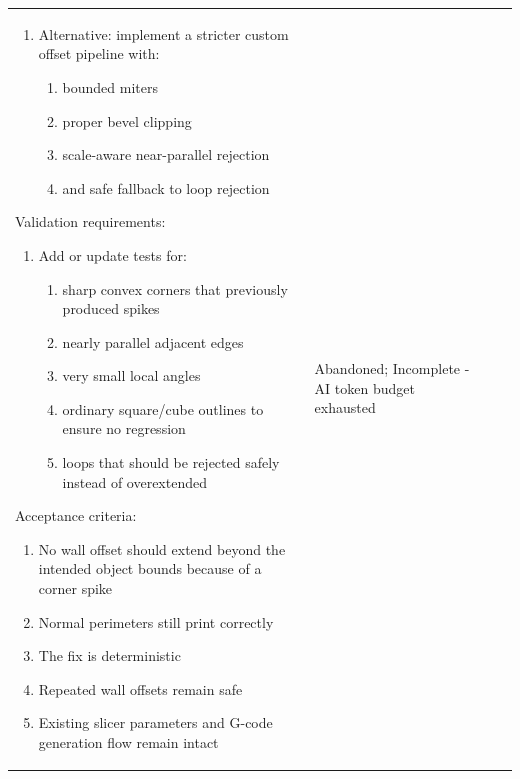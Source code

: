 \documentclass[10pt,twocolumn,a4paper]{article}
\begin{document}
\begin{longtable}{@{}p{0.6cm}p{1.5cm}p{11.0cm}p{2.7cm}@{}}
\begin{enumerate}
\begin{enumerate}
		\item{Alternative: implement a stricter custom offset pipeline with:}
		\begin{enumerate}
			\item{bounded miters}
			\item{proper bevel clipping}
			\item{scale-aware near-parallel rejection}
			\item{and safe fallback to loop rejection} 
		\end{enumerate}
	\end{enumerate}
\end{enumerate}
Validation requirements:
\begin{enumerate}
	\item{Add or update tests for:}
	\begin{enumerate}
		\item{sharp convex corners that previously produced spikes}
		\item{nearly parallel adjacent edges}
		\item{very small local angles}
		\item{ordinary square/cube outlines to ensure no regression}
		\item{loops that should be rejected safely instead of overextended} 
	\end{enumerate}
\end{enumerate}
Acceptance criteria:
\begin{enumerate}
	\item{No wall offset should extend beyond the intended object bounds because of a corner spike}
	\item{Normal perimeters still print correctly}
	\item{The fix is deterministic}
	\item{Repeated wall offsets remain safe}
	\item{Existing slicer parameters and G-code generation flow remain intact}
\end{enumerate} & Abandoned; Incomplete - AI token budget exhausted\\
\end{longtable}
\twocolumn
\end{document}
